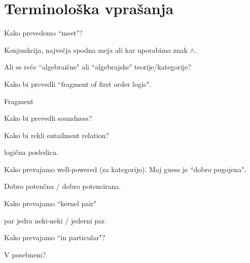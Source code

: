 \documentclass[12pt,a4paper]{article}
\newcommand\ans{\item[\textbf{A:}]}
\begin{document}
    \section*{Terminološka vprašanja}
    \begin{vprasanja}
        \item Kako prevedemo ``meet"?
        \ans Konjunkcija, največja spodna meja ali kar uporabimo znak $\land$.
        \item Ali se reče ``algebraične" ali ``algebrajske" teorije/kategorije?
        \ans
        \item Kako bi prevedli ``fragment of first order logic".
        \ans Fragment
        \item Kako bi prevedli soundness?
        \ans
        \item Kako bi rekli entailment relation?
        \ans logična posledica.
        \item Kako prevajamo well-powered (za kategorijo). Moj guess je ``dobro pogojena".
        \ans Dobro potenčna / dobro potencirana.
        \item Kako prevajamo ``kernel pair"
        \ans par jedra neki-neki / jederni par.
        \item Kako prevajamo ``in particular"?
        \ans V posebnem?
    \end{vprasanja}
\end{document}
